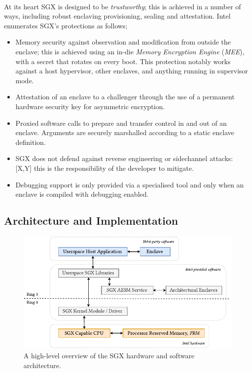 \paragraph{} At its heart SGX is designed to be \textit{trustworthy}; this is achieved in a number of ways, including robust enclaving provisioning, sealing and attestation. Intel enumerates SGX's protections as follows;

\begin{itemize}
    \item Memory security against observation and modification from outside the enclave; this is achieved using an in-die \textit{Memory Encryption Engine} (\textit{MEE}), with a secret that rotates on every boot. This protection notably works against a host hypervisor, other enclaves, and anything running in supervisor mode.
    \item Attestation of an enclave to a challenger through the use of a permanent hardware security key for asymmetric encryption.
    \item Proxied software calls to prepare and transfer control in and out of an enclave. Arguments are securely marshalled according to a static enclave definition.
    \item SGX does not defend against reverse engineering or sidechannel attacks: [X,Y] this is the responsibility of the developer to mitigate.
    \item Debugging support is only provided via a specialised tool and only when an enclave is compiled with debugging enabled.
\end{itemize}

\subsection{Architecture and Implementation}

\begin{figure}[]
    \centering
    \includegraphics[width=0.9\linewidth]{figures/SGX-AdvArchitecture.pdf}
    \caption{A high-level overview of the SGX hardware and software architecture.}
    \label{fig:sgx-advarch}
\end{figure}

